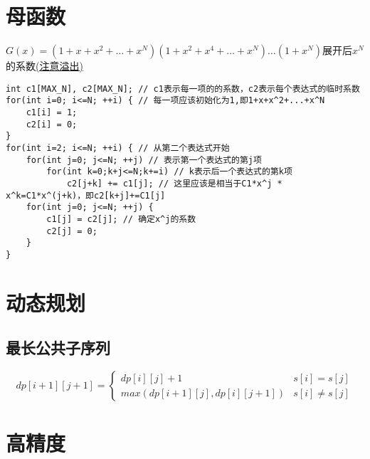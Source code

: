 \documentclass[a4paper]{ctexrep}
\begin{document}
\section{母函数}
$G(x)=(1+x+x^2+\dots+x^N)(1+x^2+x^4+\dots+x^N)\dots(1+x^N)$展开后$x^N$的系数\underline{(注意溢出)}\\
\begin{lstlisting}
int c1[MAX_N], c2[MAX_N]; // c1表示每一项的的系数，c2表示每个表达式的临时系数
for(int i=0; i<=N; ++i) { // 每一项应该初始化为1,即1+x+x^2+...+x^N
	c1[i] = 1;
	c2[i] = 0;
}
for(int i=2; i<=N; ++i) { // 从第二个表达式开始
	for(int j=0; j<=N; ++j) // 表示第一个表达式的第j项
		for(int k=0;k+j<=N;k+=i) // k表示后一个表达式的第k项
			c2[j+k] += c1[j]; // 这里应该是相当于C1*x^j * x^k=C1*x^(j+k)，即c2[k+j]+=C1[j]
	for(int j=0; j<=N; ++j) {
		c1[j] = c2[j]; // 确定x^j的系数
		c2[j] = 0;
	}
}
\end{lstlisting}
\section{动态规划}
\subsection{最长公共子序列}
$$
dp[i+1][j+1]=\begin{cases}
	dp[i][j]+1 & s[i]=s[j] \\
	max(dp[i+1][j], dp[i][j+1]) & s[i] \neq s[j]
\end{cases}
$$


\section{高精度}
\end{document}
